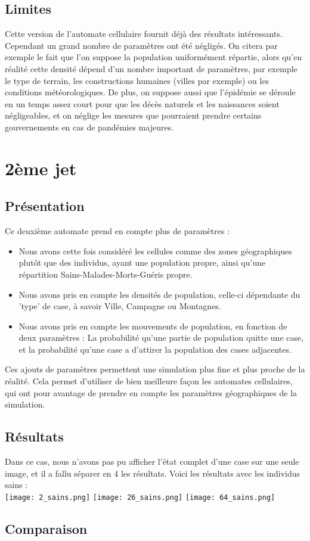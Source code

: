 \documentclass{article}
\begin{document}
\subsection{Limites}
	Cette version de l'automate cellulaire fournit déjà des résultats intéressants. Cependant un grand nombre de paramètres ont été négligés. On citera par exemple le fait que l'on suppose la population uniformément répartie, alors qu'en réalité cette densité dépend d'un nombre important de paramètres, par exemple le type de terrain, les constructions humaines (villes par exemple) ou les conditions météorologiques. De plus, on suppose aussi que l'épidémie se déroule en un temps assez court pour que les décès naturels et les naissances soient négligeables, et on néglige les mesures que pourraient prendre certains gouvernements en cas de pandémies majeures.
	
	
	
\section{2ème jet}

\subsection{Présentation}
	Ce deuxième automate prend en compte plus de paramètres : 
	\begin{itemize}
	\item Nous avons cette fois considéré les cellules comme des zones géographiques plutôt que des individus, ayant une population propre, ainsi qu'une répartition Sains-Malades-Morts-Guéris propre.
	\item Nous avons pris en compte les densités de population, celle-ci dépendante du 'type' de case, à savoir Ville, Campagne ou Montagnes.
	\item Nous avons pris en compte les mouvements de population, en fonction de deux paramètres : La probabilité qu'une partie de population quitte une case, et la probabilité qu'une case a d'attirer la population des cases adjacentes.
	\end{itemize}
	
	Ces ajouts de paramètres permettent une simulation plus fine et plus proche de la réalité. Cela permet d'utiliser de bien meilleure façon les automates cellulaires, qui ont pour avantage de prendre en compte les paramètres géographiques de la simulation.


\subsection{Résultats}

Dans ce cas, nous n'avons pas pu afficher l'état complet d'une case sur une seule image, et il a fallu séparer en 4 les résultats. Voici les résultats avec les individus sains : \\[0.6cm]
\texttt{[image: 2\_sains.png]} 
\texttt{[image: 26\_sains.png]} 
\texttt{[image: 64\_sains.png]} 


\subsection{Comparaison}
\end{document}
